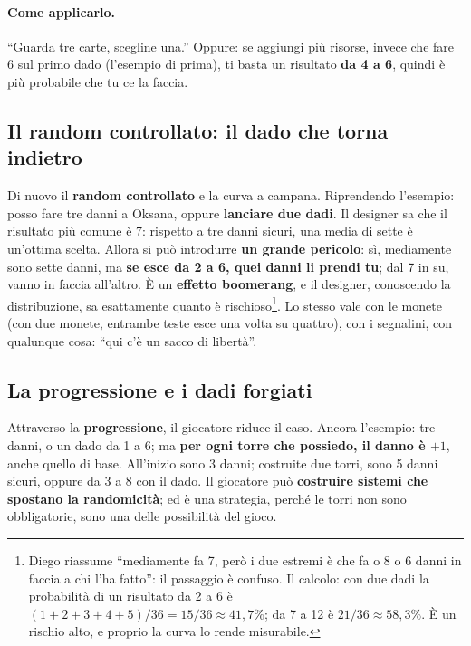 \paragraph{Come applicarlo.} ``Guarda tre carte, scegline una.'' Oppure: se aggiungi più
risorse, invece che fare 6 sul primo dado (l'esempio di prima), ti basta un risultato \textbf{da
4 a 6}, quindi è più probabile che tu ce la faccia.

\subsection{Il random controllato: il dado che torna indietro}

Di nuovo il \textbf{random controllato} e la curva a campana. Riprendendo l'esempio: posso fare
tre danni a Oksana, oppure \textbf{lanciare due dadi}. Il designer sa che il risultato più
comune è 7: rispetto a tre danni sicuri, una media di sette è un'ottima scelta. Allora si può
introdurre \textbf{un grande pericolo}: sì, mediamente sono sette danni, ma \textbf{se esce da
2 a 6, quei danni li prendi tu}; dal 7 in su, vanno in faccia all'altro. È un
\textbf{effetto boomerang}, e il designer, conoscendo la distribuzione, sa esattamente quanto
è rischioso\footnote{Diego riassume ``mediamente fa 7, però i due estremi è che fa o 8 o 6
danni in faccia a chi l'ha fatto'': il passaggio è confuso. Il calcolo: con due dadi la
probabilità di un risultato da 2 a 6 è $(1+2+3+4+5)/36 = 15/36 \approx 41{,}7\%$; da 7 a 12
è $21/36 \approx 58{,}3\%$. È un rischio alto, e proprio la curva lo rende misurabile.}. Lo
stesso vale con le monete (con due monete, entrambe teste esce una volta su quattro), con i
segnalini, con qualunque cosa: ``qui c'è un sacco di libertà''.

\subsection{La progressione e i dadi forgiati}

Attraverso la \textbf{progressione}, il giocatore riduce il caso. Ancora l'esempio: tre danni,
o un dado da 1 a 6; ma \textbf{per ogni torre che possiedo, il danno è $+1$}, anche quello di
base. All'inizio sono 3 danni; costruite due torri, sono 5 danni sicuri, oppure da 3 a 8 con il
dado. Il giocatore può \textbf{costruire sistemi che spostano la randomicità}; ed è una
strategia, perché le torri non sono obbligatorie, sono una delle possibilità del gioco.


